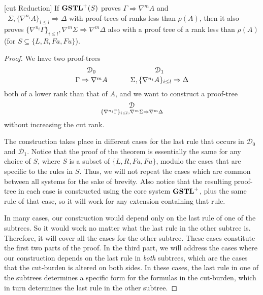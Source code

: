 \documentclass[12pt,a4paper]{article}
\begin{document}
\begin{thm}\label{thm:gstl-cut-reduction}[cut Reduction]
If $\mathbf{GSTL}^+(S)$ proves $\Gamma \Rightarrow \nabla^m A$ and\\\ $\Sigma , \{\nabla^{n_i} A\}_{i \leq l} \Rightarrow \Delta$ with proof-trees of ranks less than $\rho(A)$, then it also proves $\{\nabla^{n_i} \Gamma\}_{i \leq l} , \nabla^m\Sigma \Rightarrow \nabla^m\Delta$ also with a proof tree of a rank less than $\rho(A)$ (for $S \subseteq \{L, R, Fa, Fu\}$).
\end{thm}
\begin{proof}
	We have two proof-trees
  \[
    {\mathcal{D}_0
    \atop
    \Gamma \Rightarrow \nabla^m A}
    \hspace{3em}
    {\mathcal{D}_1
    \atop
    \Sigma , \{\nabla^{n_i} A\}_{i \leq l} \Rightarrow \Delta}
  \]
  both of a lower rank than that of $A$, and we want to construct a proof-tree
  \[\mathcal{D} \atop \{\nabla^{n_i} \Gamma\}_{i \leq l} , \nabla^m \Sigma \Rightarrow \nabla^m \Delta \]
  without increasing the cut rank.

	The construction takes place in different cases for the last rule that occurs in $\mathcal{D}_0$ and $\mathcal{D}_1$. Notice that the proof of the theorem is essentially the same for any choice of $S$, where $S$ is a subset of $\{L, R, Fa, Fu\}$, modulo the cases that are specific to the rules in $S$. Thus, we will not repeat the cases which are common between all systems for the sake of brevity. Also notice that the resulting proof-tree in each case is constructed using the core system $\mathbf{GSTL}^+$, plus the same rule of that case, so it will work for any extension containing that rule.

	In many cases, our construction would depend only on the last rule of one of the subtrees. So it would work no matter what the last rule in the other subtree is. Therefore, it will cover all the cases for the other subtree. These cases constitute the first two parts of the proof. In the third part, we will address the cases where our construction depends on the last rule in \emph{both} subtrees, which are the cases that the cut-burden is altered on both sides. In these cases, the last rule in one of the subtrees determines a specific form for the formulas in the cut-burden, which in turn determines the last rule in the other subtree.


\end{proof}
\end{document}
